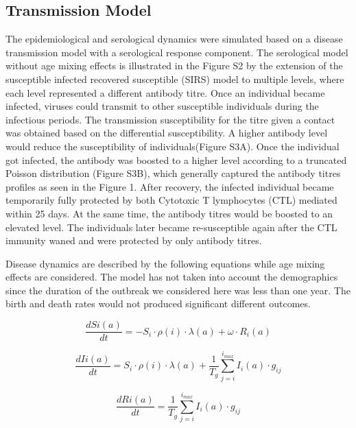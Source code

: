 \documentclass{article}
\begin{document}
\subsection{Transmission Model}
The epidemiological and serological dynamics were simulated based on a disease transmission model with a serological response component. The serological model without age mixing effects is illustrated in the Figure S2 by the extension of the susceptible infected recovered susceptible (SIRS) model to multiple levels, where each level represented a different antibody titre. Once an individual became infected, viruses could transmit to other susceptible individuals during the infectious periods. The transmission susceptibility for the titre given a contact was obtained based on the differential susceptibility. A higher antibody level would reduce the susceptibility of individuals(Figure S3A). Once the individual got infected, the antibody was boosted to a higher level according to a truncated Poisson distribution (Figure S3B), which generally captured the antibody titres profiles as seen in the Figure 1. After recovery, the infected individual became temporarily fully protected by both Cytotoxic T lymphocytes (CTL) mediated within 25 days. At the same time, the antibody titres would be boosted to an elevated level. The individuals later became re-susceptible again after the CTL immunity waned and were protected by only antibody titres.

Disease dynamics are described by the following equations while age mixing effects are considered. The model has not taken into account the demographics since the duration of the outbreak we considered here was less than one year. The birth and death rates would not produced significant different outcomes.

\begin{equation}
 \label{simple_equation}
 \frac{dS{i}(a)}{dt}=-S_{i}\cdot\rho(i)\cdot\lambda(a)+\omega\cdot R_{i}(a)
\end{equation}

\begin{equation}
 \frac{dI{i}(a)}{dt}=S_{i}\cdot\rho(i)\cdot\lambda(a)+\frac{1}{T_{g}}\sum_{j=i}^{i_{max}} I_{i}(a)\cdot g_{ij}
\end{equation}

\begin{equation}
 \frac{dR{i}(a)}{dt}=\frac{1}{T_{g}} \sum_{j=i}^{i_{max}} I_{i}(a)\cdot g_{ij}
\end{equation}
\end{document}
